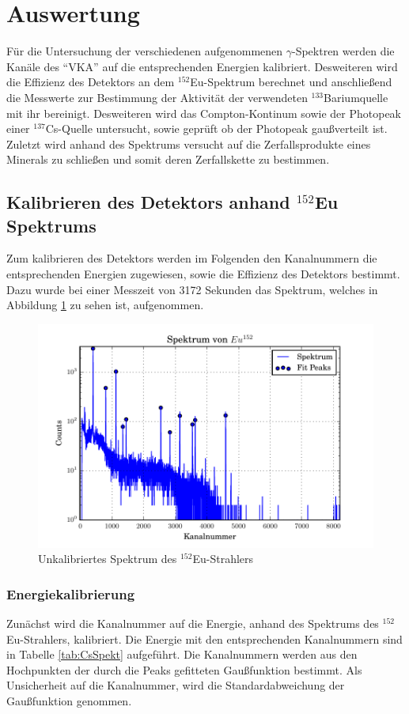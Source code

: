 \section{Auswertung}
\label{sec:Auswertung}
Für die Untersuchung der verschiedenen aufgenommenen $\gamma$-Spektren werden die Kanäle des ``VKA'' auf die entsprechenden Energien kalibriert. Desweiteren wird die Effizienz des Detektors an dem $^{152}$Eu-Spektrum berechnet und anschließend die Messwerte zur Bestimmung der Aktivität der verwendeten $^{133}$Bariumquelle mit ihr bereinigt. Desweiteren wird das Compton-Kontinum sowie der Photopeak einer $^{137}$Cs-Quelle untersucht, sowie geprüft ob der Photopeak gaußverteilt ist. Zuletzt wird anhand des Spektrums versucht auf die Zerfallsprodukte eines Minerals zu schließen und somit deren Zerfallskette zu bestimmen.


\subsection{Kalibrieren des Detektors anhand $^{152}$Eu Spektrums}
Zum kalibrieren des Detektors werden im Folgenden den Kanalnummern die entsprechenden Energien zugewiesen, sowie die Effizienz des Detektors bestimmt. Dazu wurde bei einer Messzeit von 3172 Sekunden das Spektrum, welches in Abbildung \ref{fig:spekEu} zu sehen ist, aufgenommen.
\begin{figure}[H]
  \centering
  \includegraphics[width=\textwidth]{./Bilder/SpektEu.pdf}
  \caption{Unkalibriertes Spektrum des $^{152}$Eu-Strahlers}
  \label{fig:spekEu}
\end{figure}

\subsubsection{Energiekalibrierung}
\label{sec:Kalb}
Zunächst wird die Kanalnummer auf die Energie, anhand des Spektrums des $^{152}$Eu-Strahlers, kalibriert. Die Energie mit den entsprechenden Kanalnummern sind in Tabelle \ref{tab:CsSpekt} aufgeführt. Die Kanalnummern werden aus den Hochpunkten der durch die Peaks gefitteten Gaußfunktion bestimmt. Als Unsicherheit auf die Kanalnummer, wird die Standardabweichung der Gaußfunktion genommen.

